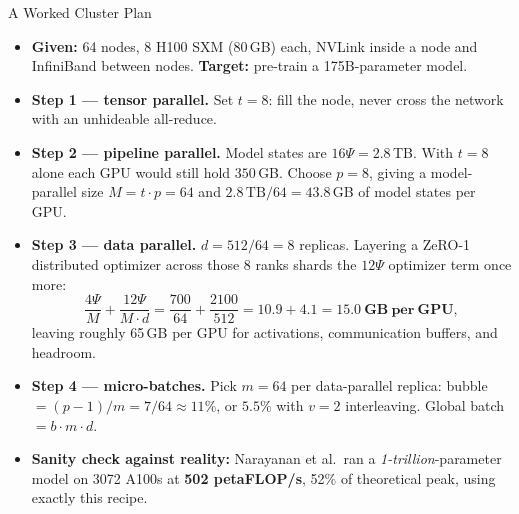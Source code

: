 \begin{frame}{A Worked Cluster Plan}
  \begin{itemize}\footnotesize\itemsep0.3em
    \item[\textcolor{red}{$\blacktriangleright$}] \textbf{Given:} 64 nodes, 8 H100 SXM (80\,GB) each, NVLink inside a node and InfiniBand between nodes. \textbf{Target:} pre-train a 175B-parameter model.
    \item[\textcolor{red}{$\blacktriangleright$}] \textbf{Step 1 --- tensor parallel.} Set $t = 8$: fill the node, never cross the network with an unhideable all-reduce.
    \item[\textcolor{red}{$\blacktriangleright$}] \textbf{Step 2 --- pipeline parallel.} Model states are $16\Psi = 2.8$\,TB. With $t = 8$ alone each GPU would still hold $350$\,GB. Choose $p = 8$, giving a model-parallel size $M = t \cdot p = 64$ and $2.8\,\text{TB}/64 = 43.8$\,GB of model states per GPU.
    \item[\textcolor{red}{$\blacktriangleright$}] \textbf{Step 3 --- data parallel.} $d = 512 / 64 = 8$ replicas. Layering a ZeRO-1 distributed optimizer across those 8 ranks shards the $12\Psi$ optimizer term once more:
      \[
        \frac{4\Psi}{M} + \frac{12\Psi}{M \cdot d} = \frac{700}{64} + \frac{2100}{512} = 10.9 + 4.1 = \mathbf{15.0\ GB\ per\ GPU},
      \]
      leaving roughly 65\,GB per GPU for activations, communication buffers, and headroom.
    \item[\textcolor{red}{$\blacktriangleright$}] \textbf{Step 4 --- micro-batches.} Pick $m = 64$ per data-parallel replica: bubble $= (p-1)/m = 7/64 \approx 11\%$, or $5.5\%$ with $v = 2$ interleaving. Global batch $= b \cdot m \cdot d$.
    \item[\textcolor{red}{$\blacktriangleright$}] \textbf{Sanity check against reality:} Narayanan et al.\ ran a \emph{1-trillion}-parameter model on 3072 A100s at \textbf{502 petaFLOP/s}, 52\% of theoretical peak, using exactly this recipe.
  \end{itemize}
\end{frame}

